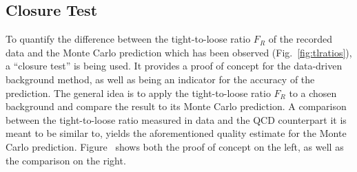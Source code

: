 \subsection{Closure Test}
\label{sec:closure-test}

To quantify the difference between the tight-to-loose ratio $F_R$ of the recorded data and the Monte Carlo prediction which has been observed (Fig.~\ref{fig:tlratios}), a ``closure test'' is being used. It provides a proof of concept for the data-driven background method, as well as being an indicator for the accuracy of the prediction. The general idea is to apply the tight-to-loose ratio $F_R$ to a chosen background and compare the result to its Monte Carlo prediction. A comparison between the tight-to-loose ratio measured in data and the QCD counterpart it is meant to be similar to, yields the aforementioned quality estimate for the Monte Carlo prediction. Figure~ shows both the proof of concept on the left, as well as the comparison on the right.

